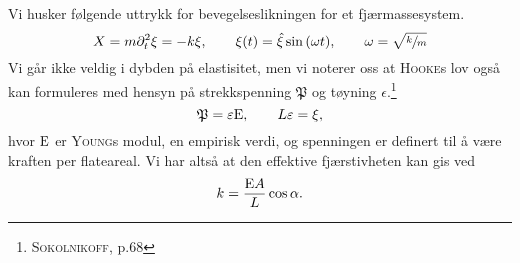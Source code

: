 Vi husker følgende uttrykk for bevegelseslikningen for et fjærmassesystem.
\[
X = m\partial_t^2 \xi = -k\xi, \qquad \xi(t) = \hat{\xi}\sin{(\omega t)}, \qquad \omega = \sqrt{\sfrac{k}{m}}
\]
Vi går ikke veldig i dybden på elastisitet, men vi noterer oss at \textsc{Hooke}s lov også kan formuleres med hensyn på strekkspenning $\mathfrak{P}$ og tøyning $\epsilon$.\footnote{\cite{sokolnikoff1956mathematical} \textsc{Sokolnikoff}, p.68}
\[
\mathfrak{P} = \varepsilon\mathrm{E}, \qquad L\varepsilon = \xi,
\]
hvor $\mathrm{E}$ er \textsc{Young}s modul, en empirisk verdi, og spenningen er definert til å være kraften per flateareal.
Vi har altså at den effektive fjærstivheten kan gis ved
\[
k = \frac{\mathrm{E} A}{L}\cos{\alpha}.
\]
